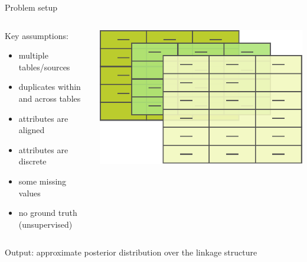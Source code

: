 \documentclass[compress]{beamer}
\newcommand{\1}[1]{\mathbb{I}\!\left[#1\right]} %
\theoremstyle{plain}
\begin{document}
\begin{frame}{Problem setup}
  \setlength{\leftmargini}{1.1em}
  \begin{columns}[onlytextwidth]
    \begin{column}{0.5\linewidth}
      Key assumptions:
      \begin{itemize}
        \item multiple tables\slash sources
        \item duplicates within and across tables
        \item attributes are aligned
        \item attributes are discrete
        \item some missing values
        \item no ground truth (unsupervised)
      \end{itemize}
    \end{column}
    \hfill
    \begin{column}{0.4\linewidth}
      \includegraphics[width=\linewidth]{multiple-datasets.pdf}
    \end{column}
  \end{columns}
  \pause
  \bigskip

  Output: approximate posterior distribution over the linkage structure
\end{frame}
\end{document}
